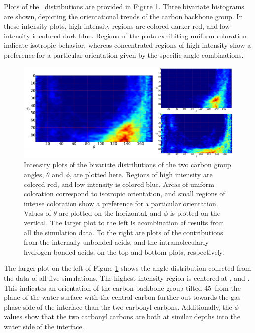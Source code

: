 Plots of the \thetaphi~distributions are provided in Figure \ref{fig:theta-phi}. Three bivariate histograms are shown, depicting the orientational trends of the carbon backbone group. In these intensity plots, high intensity regions are colored darker red, and low intensity is colored dark blue. Regions of the plots exhibiting uniform coloration indicate isotropic behavior, whereas concentrated regions of high intensity show a preference for a particular orientation given by the specific angle combinations.

\begin{figure}[h!]
	\begin{center}
		\includegraphics[scale=1.0]{images/orientation/theta-phi.png}
		\caption{Intensity plots of the bivariate distributions of the two carbon group angles, $\theta$ and $\phi$, are plotted here. Regions of high intensity are colored red, and low intensity is colored blue. Areas of uniform coloration correspond to isotropic orientation, and small regions of intense coloration show a preference for a particular orientation. Values of $\theta$ are plotted on the horizontal, and $\phi$ is plotted on the vertical. The larger plot to the left is  acombination of results from all the simulation data. To the right are plots of the contributions from the internally unbonded acids, and the intramolecularly hydrogen bonded acids, on the top and bottom plots, respectively.}
		\label{fig:theta-phi}
	\end{center}
\end{figure}


The larger plot on the left of Figure \ref{fig:theta-phi} shows the angle distribution collected from the data of all five simulations. The highest intensity region is centered at \degr, and \degr. This indicates an orientation of the carbon backbone group tilted 45\degr~from the plane of the water surface with the central carbon further out towards the gas-phase side of the interface than the two carbonyl carbons. Additionally, the $\phi$ values show that the two carbonyl carbons are both at similar depths into the water side of the interface.

